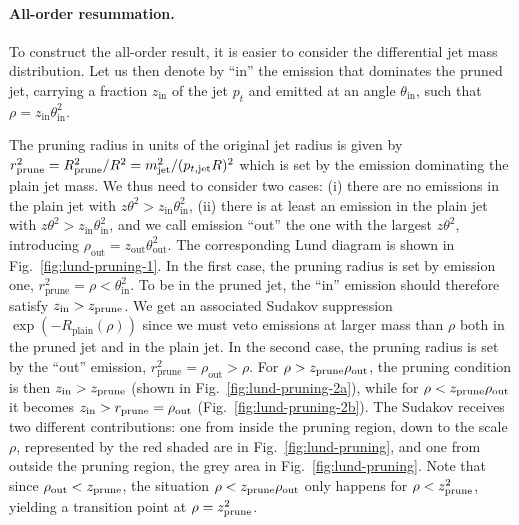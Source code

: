 \paragraph{All-order resummation.} 
%
To construct the all-order result, it is easier to consider the
differential jet mass distribution. Let us then denote by ``in'' the
emission that dominates the pruned jet, carrying a fraction $z_\text{in}$ of
the jet $p_t$ and emitted at an angle $\theta_\text{in}$, such that
$\rho=z_\text{in}\theta_\text{in}^2$.


The pruning radius in units of the original jet radius is given by
$r_{\text{prune}}^2=R_{\text{prune}}^2/R^2=m_{\text{jet}}^2/(p_{t,\text{jet}}R)^2$ which is set by the
emission dominating the plain jet mass.
%
We thus need to consider two cases: (i) there are no emissions in the
plain jet with $z\theta^2>z_\text{in}\theta_\text{in}^2$, (ii) there
is at least an emission in the plain jet with
$z\theta^2>z_\text{in}\theta_\text{in}^2$, and we call emission
``out'' the one with the largest $z\theta^2$, introducing
$\rho_\text{out}=z_\text{out}\theta_\text{out}^2$.
%
The corresponding Lund diagram is shown in
Fig.~\ref{fig:lund-pruning-1}.
%
In the first case, the pruning radius is set by emission one,
$r_{\text{prune}}^2=\rho<\theta_\text{in}^2$. To be in the pruned jet,
the ``in'' emission should therefore satisfy $z_\text{in}>z_{\text{prune}}$. We
get an associated Sudakov suppression $\exp(-R_\text{plain}(\rho))$
since we must veto emissions at larger mass than $\rho$ both in the
pruned jet and in the plain jet.
%
In the second case, the pruning radius is set by the ``out'' emission,
\ie $r_{\text{prune}}^2=\rho_\text{out}>\rho$. For
$\rho>z_{\text{prune}}\rho_{\text{out}}$, the pruning condition is then
$z_\text{in}>z_{\text{prune}}$ (shown in Fig.~\ref{fig:lund-pruning-2a}), while
for $\rho<z_{\text{prune}}\rho_{\text{out}}$ it becomes
$z_\text{in}>r_{\text{prune}}=\rho_\text{out}$
(Fig.~\ref{fig:lund-pruning-2b}).
%
The Sudakov receives two different contributions: one from inside the
pruning region, down to the scale $\rho$, represented by the red
shaded are in Fig.~\ref{fig:lund-pruning}, and one from outside the
pruning region, the grey area in Fig.~\ref{fig:lund-pruning}.
%
Note that since $\rho_\text{out}<z_{\text{prune}}$, the situation
$\rho<z_{\text{prune}}\rho_{\text{out}}$ only happens for $\rho<z_{\text{prune}}^2$,
yielding a transition point at $\rho=z_{\text{prune}}^2$.

